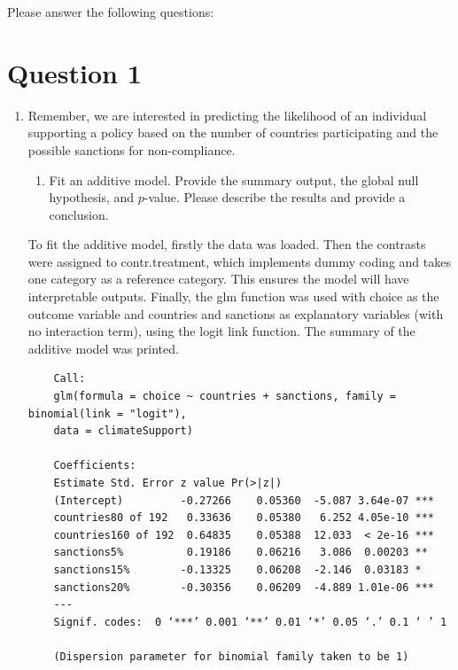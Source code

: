\documentclass[12pt,letterpaper]{article}
\begin{document}
\newpage
\noindent Please answer the following questions:

\vspace{.25cm}

\section*{Question 1}

\begin{enumerate}
	\item
	Remember, we are interested in predicting the likelihood of an individual supporting a policy based on the number of countries participating and the possible sanctions for non-compliance.
	\begin{enumerate}
		\item [] Fit an additive model. Provide the summary output, the global null hypothesis, and $p$-value. Please describe the results and provide a conclusion.
	\end{enumerate}

\vspace{.5cm}

\noindent To fit the additive model, firstly the data was loaded. Then the contrasts were assigned to contr.treatment, which implements dummy coding and takes one category as a reference category. This ensures the model will have interpretable outputs. Finally, the glm function was used with choice as the outcome variable and countries and sanctions as explanatory variables (with no interaction term), using the logit link function. The summary of the additive model was printed.



\begin{verbatim}
	Call:
	glm(formula = choice ~ countries + sanctions, family = binomial(link = "logit"), 
	data = climateSupport)
	
	Coefficients:
	Estimate Std. Error z value Pr(>|z|)    
	(Intercept)         -0.27266    0.05360  -5.087 3.64e-07 ***
	countries80 of 192   0.33636    0.05380   6.252 4.05e-10 ***
	countries160 of 192  0.64835    0.05388  12.033  < 2e-16 ***
	sanctions5%          0.19186    0.06216   3.086  0.00203 ** 
	sanctions15%        -0.13325    0.06208  -2.146  0.03183 *  
	sanctions20%        -0.30356    0.06209  -4.889 1.01e-06 ***
	---
	Signif. codes:  0 ‘***’ 0.001 ‘**’ 0.01 ‘*’ 0.05 ‘.’ 0.1 ‘ ’ 1
	
	(Dispersion parameter for binomial family taken to be 1)
	

\end{verbatim}
\end{enumerate}
\end{document}
